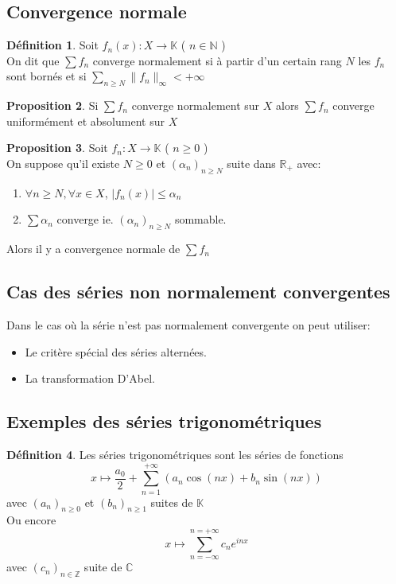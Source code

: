 \documentclass[10pt,a4paper]{article}
\theoremstyle{definition}
\newtheorem{proposition}{Proposition}[section]
\newtheorem{definition}[proposition]{Définition}
\begin{document}
\subsection{Convergence normale}
\begin{definition}
    Soit $f_n(x): X \to \mathbb{K}$ ( $n \in \mathbb{N}$ ) \\
    On dit que $\sum f_n$ converge normalement si à partir d'un certain rang $N$ les $f_n$ sont bornés et si $\sum\limits_{n \geq N} \lVert f_n \rVert_\infty < +\infty$
\end{definition}
\begin{proposition}
    Si $\sum f_n$ converge normalement sur $X$ alors $\sum f_n$ converge uniformément et absolument sur $X$
\end{proposition}
\begin{proposition}
    Soit $f_n: X \to \mathbb{K}$ ( $n \geq 0$ ) \\
    On suppose qu'il existe $N \geq 0$ et $(\alpha_n)_{n \geq N}$ suite dans $\mathbb{R}_+$ avec:
    \begin{enumerate}
        \item $\forall n \geq N, \forall x \in X$, $|f_n(x)| \leq \alpha_n $
        \item $\sum \alpha_n$ converge ie. $(\alpha_n)_{n \geq N}$ sommable.
    \end{enumerate}
    Alors il y a convergence normale de $\sum f_n$
\end{proposition}

\subsection{Cas des séries non normalement convergentes}
\noindent Dans le cas où la série n'est pas normalement convergente on peut utiliser:
\begin{itemize}
    \item Le critère spécial des séries alternées.
    \item La transformation D'Abel.
\end{itemize}

\subsection{Exemples des séries trigonométriques}
\begin{definition}
    Les séries trigonométriques sont les séries de fonctions
    \[x \mapsto \frac{a_0}{2} + \sum_{n = 1}^{+\infty}\left(a_n \cos(nx) + b_n \sin(nx)\right)\]
    avec $(a_n)_{n \geq 0}$ et $(b_n)_{n \geq 1}$ suites de $\mathbb{K}$ \\
    Ou encore
    \[x \mapsto \sum_{n = -\infty}^{n = +\infty}c_n e^{inx}\]
    avec $(c_n)_{n \in \mathbb{Z}}$ suite de $\mathbb{C}$
\end{definition}
\end{document}
